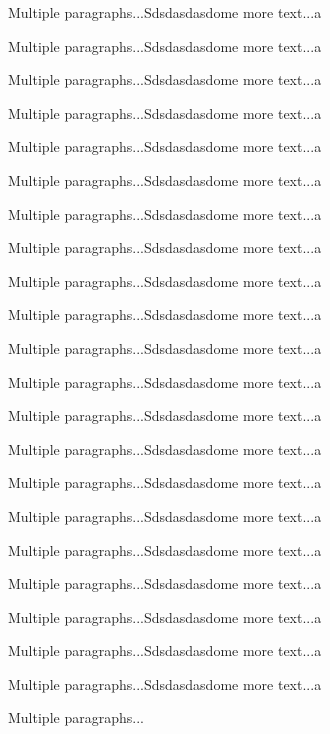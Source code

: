 \documentclass[doublespace,endnotes]{lingpaper}
\begin{document}
Multiple paragraphs...Sdsdasdasdome more text...a

Multiple paragraphs...Sdsdasdasdome more text...a

Multiple paragraphs...Sdsdasdasdome more text...a

Multiple paragraphs...Sdsdasdasdome more text...a

Multiple paragraphs...Sdsdasdasdome more text...a

Multiple paragraphs...Sdsdasdasdome more text...a

Multiple paragraphs...Sdsdasdasdome more text...a

Multiple paragraphs...Sdsdasdasdome more text...a

Multiple paragraphs...Sdsdasdasdome more text...a

Multiple paragraphs...Sdsdasdasdome more text...a

Multiple paragraphs...Sdsdasdasdome more text...a

Multiple paragraphs...Sdsdasdasdome more text...a

Multiple paragraphs...Sdsdasdasdome more text...a

Multiple paragraphs...Sdsdasdasdome more text...a

Multiple paragraphs...Sdsdasdasdome more text...a

Multiple paragraphs...Sdsdasdasdome more text...a

Multiple paragraphs...Sdsdasdasdome more text...a

Multiple paragraphs...Sdsdasdasdome more text...a

Multiple paragraphs...Sdsdasdasdome more text...a

Multiple paragraphs...Sdsdasdasdome more text...a

Multiple paragraphs...Sdsdasdasdome more text...a

Multiple paragraphs...

\end{document}
